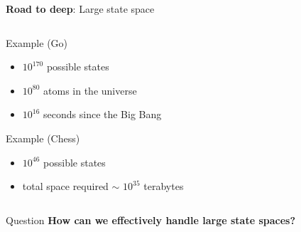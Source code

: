 \documentclass[presentation, 9pt]{beamer}\mode<presentation>{\usetheme{AMSBolognaFC}}
\begin{document}
\begin{frame}{\textbf{Road to deep}: Large state space}
\begin{columns}
\begin{column}{0.5\textwidth}
			\begin{block}{Example (Go) \, \href{}{\faLink}}
				\begin{itemize}
					\item $10^{170}$ possible states \bold{(!!!!)}
					\item $10^{80}$ atoms in the universe
					\item $10^{16}$ seconds since the Big Bang
				\end{itemize}
			\end{block}
			\begin{block}{Example (Chess) \, \href{}{\faLink}}
				\begin{itemize}
					\item $10^{46}$ possible states
					\item total space required $\sim$ $10^{35}$ terabytes
				\end{itemize}
			\end{block}
	\end{column}
	\begin{column}{0.5\textwidth}
	\centering
	\end{column}
\end{columns}

\begin{alertblock}{Question}
	\centering
	\textbf{How can we effectively handle large state spaces?}
\end{alertblock}
\end{frame}
\end{document}

